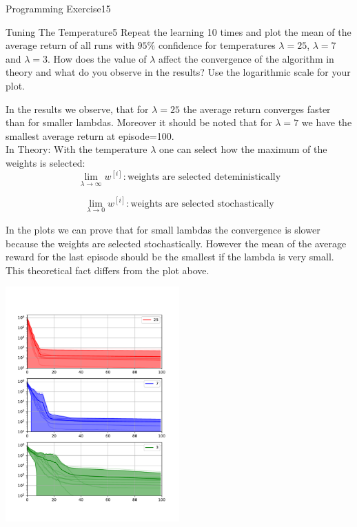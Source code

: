 \begin{questions}
\begin{question}{Programming Exercise}{15}
\end{question}



\begin{question}{Tuning The Temperature}{5}
Repeat the learning 10 times and plot the mean of the average return of all runs with $95\%$ confidence for temperatures $\lambda = 25$, $\lambda = 7$ and $\lambda = 3$. How does the value of $\lambda$ affect the convergence of the algorithm in theory and what do you observe in the results? 
Use the logarithmic scale for your plot.

\begin{answer}
In the results we observe, that for $\lambda=25$ the average return converges faster than for smaller lambdas. Moreover it should be noted that for $\lambda=7$ we have the smallest average return at episode=100.\\

In Theory: With the temperature $\lambda$ one can select how the maximum of the weights is selected:
\begin{equation}
	\lim_{\lambda \rightarrow \infty} w^{[i]}: \text{weights are selected deteministically}
\end{equation}

\begin{equation}
\lim_{\lambda \rightarrow 0} w^{[i]}: \text{weights are selected stochastically}
\end{equation}

In the plots we can prove that for small lambdas the convergence is slower because the weights are selected stochastically. However the mean of the average reward for the last episode should be the smallest if the lambda is very small. This theoretical fact differs from the plot above.
\end{answer}

\begin{center}
	\includegraphics[width=0.5\textwidth]{img/EM-c.pdf}
\end{center}


\end{question}
\end{questions}
